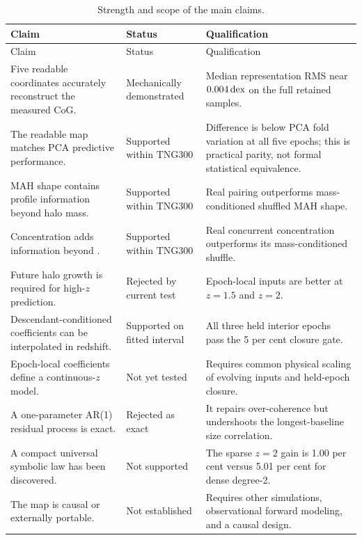 \begin{longtable}{@{}p{}p{}p{}@{}}
  \caption{Strength and scope of the main claims.}\label{tab:claim_strength}\\
  \toprule
  Claim & Status & Qualification \\
  \midrule
  \endfirsthead
  \toprule
  Claim & Status & Qualification \\
  \midrule
  \endhead
  Five readable coordinates accurately reconstruct the measured CoG. &
  Mechanically demonstrated & Median representation RMS near $0.004\,\mathrm{dex}$ on
  the full retained samples.\\
  The readable map matches PCA predictive performance. & Supported within
  TNG300 & Difference is below PCA fold variation at all five epochs; this is
  practical parity, not formal statistical equivalence.\\
  MAH shape contains profile information beyond halo mass. & Supported within
  TNG300 & Real pairing outperforms mass-conditioned shuffled MAH shape.\\
  Concentration adds information beyond \diffmah{}. & Supported within TNG300 &
  Real concurrent concentration outperforms its mass-conditioned shuffle.\\
  Future halo growth is required for high-$z$ prediction. & Rejected by current
  test & Epoch-local inputs are better at $z=1.5$ and $z=2$.\\
  Descendant-conditioned coefficients can be interpolated in redshift. &
  Supported on fitted interval & All three held interior epochs pass the 5 per
  cent closure gate.\\
  Epoch-local coefficients define a continuous-$z$ model. & Not yet tested &
  Requires common physical scaling of evolving inputs and held-epoch closure.\\
  A one-parameter AR(1) residual process is exact. & Rejected as exact & It
  repairs over-coherence but undershoots the longest-baseline size correlation.\\
  A compact universal symbolic law has been discovered. & Not supported & The
  sparse $z=2$ gain is 1.00 per cent versus 5.01 per cent for dense degree-2.\\
  The map is causal or externally portable. & Not established & Requires other
  simulations, observational forward modeling, and a causal design.\\
  \bottomrule
\end{longtable}
